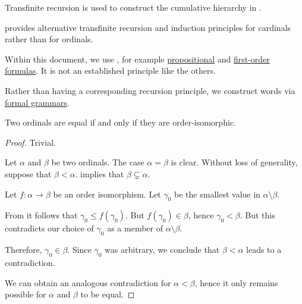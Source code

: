 \begin{remark}
\begin{thmenum}
    Transfinite recursion is used to construct the cumulative hierarchy in .

     provides alternative transfinite recursion and induction principles for cardinals rather than for ordinals.

     Within this document, we use , for example \hyperref[def:propositional_syntax/formula]{propositional} and \hyperref[def:first_order_syntax/formula]{first-order formulas}. It is not an established principle like the others.

    Rather than having a corresponding recursion principle, we construct words via \hyperref[def:formal_grammar]{formal grammars}.
  \end{thmenum}
\end{remark}

\begin{proposition}\label{thm:ordinal_isomorphism}
  Two ordinals are equal if and only if they are order-isomorphic.
\end{proposition}
\begin{proof}
  \SufficiencySubProof Trivial.

  \NecessitySubProof Let \( \alpha \) and \( \beta \) be two ordinals. The case \( \alpha = \beta \) is clear. Without loss of generality, suppose that \( \beta < \alpha \).  implies that \( \beta \subsetneq \alpha \).

  Let \( f: \alpha \to \beta \) be an order isomorphism. Let \( \gamma_0 \) be the smallest value in \( \alpha \setminus \beta \).

  From  it follows that \( \gamma_0 \leq f(\gamma_0) \). But \( f(\gamma_0) \in \beta \), hence \( \gamma_0 < \beta \). But this contradicts our choice of \( \gamma_0 \) as a member of \( \alpha \setminus \beta \).

  Therefore, \( \gamma_0 \in \beta \). Since \( \gamma_0 \) was arbitrary, we conclude that \( \beta < \alpha \) leads to a contradiction.

  We can obtain an analogous contradiction for \( \alpha < \beta \), hence it only remains possible for \( \alpha \) and \( \beta \) to be equal.
\end{proof}

